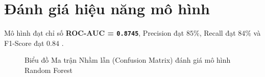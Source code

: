 \section{Đánh giá hiệu năng mô hình}
Mô hình đạt chỉ số \textbf{ROC-AUC = \texttt{0.8745}}, Precision đạt $85\%$, Recall đạt $84\%$ và F1-Score đạt $0.84$ \cite{uwais2021}.

\begin{figure}[h!]
\centering
\caption{Biểu đồ Ma trận Nhầm lẫn (Confusion Matrix) đánh giá mô hình Random Forest}
\label{fig:confusion_matrix}
\end{figure}
\newpage
